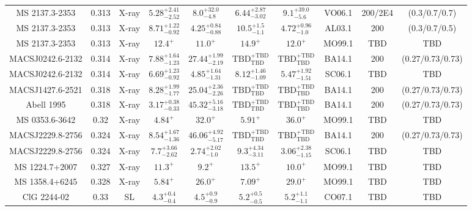 \begin{table}
\begin{tabular}{cccccccccc}
MS 2137.3-2353 & 0.313 & X-ray & ${5.28}^{+2.41}_{-2.52}$ & ${8.0}^{+32.0}_{-4.8}$ & ${6.44}^{+2.87}_{-3.02}$ & ${9.1}^{+39.0}_{-5.6}$ & VO06.1 & 200/2E4 & (0.3/0.7/0.7) \\
MS 2137.3-2353 & 0.313 & X-ray & ${8.71}^{+1.22}_{-0.92}$ & ${4.25}^{+0.84}_{-0.88}$ & ${10.5}^{+1.5}_{-1.1}$ & ${4.72}^{+0.96}_{-1.0}$ & AL03.1 & 200 & (0.3/0.7/0.5) \\
MS 2137.3-2353 & 0.313 & X-ray & ${12.4}^{+}_{}$ & ${11.0}^{+}_{}$ & ${14.9}^{+}_{}$ & ${12.0}^{+}_{}$ & MO99.1 & TBD & TBD \\
MACSJ0242.6-2132 & 0.314 & X-ray & ${7.88}^{+1.64}_{-1.23}$ & ${27.44}^{+1.99}_{-2.19}$ & ${\mathrm{TBD}}^{+\mathrm{TBD}}_{\mathrm{TBD}}$ & ${\mathrm{TBD}}^{+\mathrm{TBD}}_{\mathrm{TBD}}$ & BA14.1 & 200 & (0.27/0.73/0.73) \\
MACSJ0242.6-2132 & 0.314 & X-ray & ${6.69}^{+1.23}_{-0.92}$ & ${4.85}^{+1.64}_{-1.31}$ & ${8.12}^{+1.46}_{-1.09}$ & ${5.47}^{+1.92}_{-1.51}$ & SC06.1 & TBD & TBD \\
MACSJ1427.6-2521 & 0.318 & X-ray & ${8.28}^{+1.99}_{-1.77}$ & ${25.04}^{+2.36}_{-2.26}$ & ${\mathrm{TBD}}^{+\mathrm{TBD}}_{\mathrm{TBD}}$ & ${\mathrm{TBD}}^{+\mathrm{TBD}}_{\mathrm{TBD}}$ & BA14.1 & 200 & (0.27/0.73/0.73) \\
Abell 1995 & 0.318 & X-ray & ${3.17}^{+0.38}_{-0.33}$ & ${45.32}^{+5.16}_{-3.18}$ & ${\mathrm{TBD}}^{+\mathrm{TBD}}_{\mathrm{TBD}}$ & ${\mathrm{TBD}}^{+\mathrm{TBD}}_{\mathrm{TBD}}$ & BA14.1 & 200 & (0.27/0.73/0.73) \\
MS 0353.6-3642 & 0.32 & X-ray & ${4.84}^{+}_{}$ & ${32.0}^{+}_{}$ & ${5.91}^{+}_{}$ & ${36.0}^{+}_{}$ & MO99.1 & TBD & TBD \\
MACSJ2229.8-2756 & 0.324 & X-ray & ${8.54}^{+1.67}_{-1.36}$ & ${46.06}^{+4.92}_{-5.17}$ & ${\mathrm{TBD}}^{+\mathrm{TBD}}_{\mathrm{TBD}}$ & ${\mathrm{TBD}}^{+\mathrm{TBD}}_{\mathrm{TBD}}$ & BA14.1 & 200 & (0.27/0.73/0.73) \\
MACSJ2229.8-2756 & 0.324 & X-ray & ${7.7}^{+3.66}_{-2.62}$ & ${2.74}^{+2.02}_{-1.0}$ & ${9.3}^{+4.34}_{-3.11}$ & ${3.06}^{+2.38}_{-1.15}$ & SC06.1 & TBD & TBD \\
MS 1224.7+2007 & 0.327 & X-ray & ${11.3}^{+}_{}$ & ${9.2}^{+}_{}$ & ${13.5}^{+}_{}$ & ${10.0}^{+}_{}$ & MO99.1 & TBD & TBD \\
MS 1358.4+6245 & 0.328 & X-ray & ${5.84}^{+}_{}$ & ${26.0}^{+}_{}$ & ${7.09}^{+}_{}$ & ${29.0}^{+}_{}$ & MO99.1 & TBD & TBD \\
ClG 2244-02 & 0.33 & SL & ${4.3}^{+0.4}_{-0.4}$ & ${4.5}^{+0.9}_{-0.9}$ & ${5.2}^{+0.5}_{-0.5}$ & ${5.2}^{+1.1}_{-1.1}$ & CO07.1 & TBD & TBD \\

\end{tabular}
\end{table}
